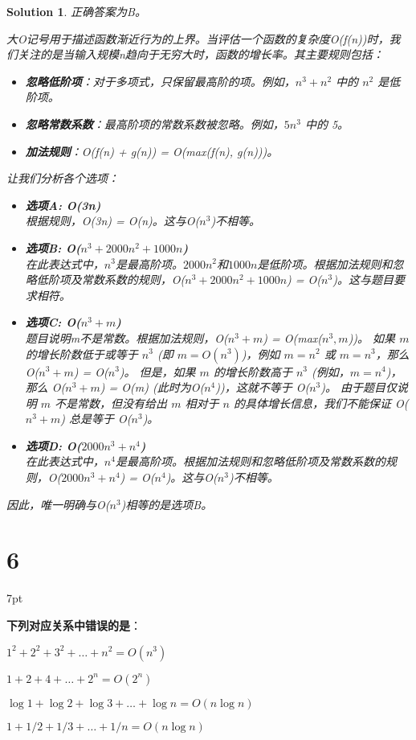 \documentclass[UTF8]{report}
\newtheorem{solution}{Solution}
\theoremstyle{MyLineTheoremStyle} %
\theoremstyle{MyBlockTheoremStyle} %
\theoremstyle{MySubsubsectionStyle} %
\newenvironment{graybox}{%
        \def\FrameCommand{%
        \hspace{1pt}%
        {\color{gray}\small \vrule width 2pt}%
        {\color{graybox_color}\vrule width 4pt}%
        \colorbox{graybox_color}%
        }%
        \MakeFramed{\advance\hsize-\width\FrameRestore}%
        \noindent\hspace{-4.55pt}%
        \begin{adjustwidth}{}{7pt}%
        \vspace{2pt}\vspace{2pt}%
        }
        {%
        \vspace{2pt}\end{adjustwidth}\endMakeFramed%
        }
\begin{document}
\begin{solution}
正确答案为B。

大O记号用于描述函数渐近行为的上界。当评估一个函数的复杂度O(f(n))时，我们关注的是当输入规模n趋向于无穷大时，函数的增长率。其主要规则包括：
\begin{itemize}
    \item \textbf{忽略低阶项}：对于多项式，只保留最高阶的项。例如，$n^3+n^2$ 中的 $n^2$ 是低阶项。
    \item \textbf{忽略常数系数}：最高阶项的常数系数被忽略。例如，$5n^3$ 中的 5。
    \item \textbf{加法规则}：O(f(n) + g(n)) = O(max(f(n), g(n)))。
\end{itemize}
让我们分析各个选项：
\begin{itemize}
    \item \textbf{选项A: O(3n)} \\
    根据规则，O(3n) = O(n)。这与O($n^3$)不相等。
    \item \textbf{选项B: O($n^3+2000n^2+1000n$)} \\
    在此表达式中，$n^3$是最高阶项。$2000n^2$和$1000n$是低阶项。根据加法规则和忽略低阶项及常数系数的规则，O($n^3+2000n^2+1000n$) = O($n^3$)。这与题目要求相符。
    \item \textbf{选项C: O($n^3+m$)} \\
    题目说明m不是常数。根据加法规则，O($n^3+m$) = O(max($n^3, m$))。
    如果 $m$ 的增长阶数低于或等于 $n^3$ (即 $m = O(n^3)$)，例如 $m=n^2$ 或 $m=n^3$，那么 O($n^3+m$) = O($n^3$)。
    但是，如果 $m$ 的增长阶数高于 $n^3$ (例如，$m = n^4$)，那么 O($n^3+m$) = O(m) (此时为O($n^4$))，这就不等于 O($n^3$)。
    由于题目仅说明 $m$ 不是常数，但没有给出 $m$ 相对于 $n$ 的具体增长信息，我们不能保证 O($n^3+m$) 总是等于 O($n^3$)。
    \item \textbf{选项D: O($2000n^3+n^4$)} \\
    在此表达式中，$n^4$是最高阶项。根据加法规则和忽略低阶项及常数系数的规则，O($2000n^3+n^4$) = O($n^4$)。这与O($n^3$)不相等。
\end{itemize}
因此，唯一明确与O($n^3$)相等的是选项B。
\end{solution}

\section*{6}

\begin{graybox}
\textbf{下列对应关系中错误的是}：
\begin{circledenum}
    \item $1^2+2^2+3^2+\dots+n^2 = O(n^3)$
    \item $1+2+4+\dots+2^n = O(2^n)$
    \item $\log1+\log2+\log3+\dots+\log n = O(n\log n)$
    \item $1+1/2+1/3+\dots+1/n = O(n\log n)$
\end{circledenum}
\end{graybox}
\end{document}
